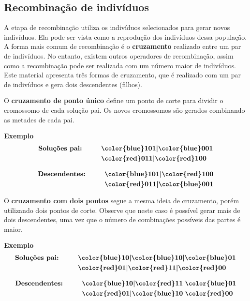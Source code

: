 \subsection{Recombinação de indivíduos}

A etapa de recombinação utiliza os indivíduos selecionados para gerar novos indivíduos. Ela pode ser vista como a reprodução dos indivíduos dessa população. A forma mais comum de recombinação é o \textbf{cruzamento} realizado entre um par de indivíduos. No entanto, existem outros operadores de recombinação, assim como a recombinação pode ser realizada com um número maior de indivíduos. Este material apresenta três formas de cruzamento, que é realizado com um par de indivíduos e gera dois descendentes (filhos).

O \textbf{cruzamento de ponto único} define um ponto de corte para dividir o cromossomo de cada solução pai. Os novos cromossomos são gerados combinando as metades de cada pai.

\insertspace
\textbf{Exemplo}
\begin{align*}
	\textbf{Soluções pai:}	& \hspace{1cm} \textbf{{\color{blue}101}|{\color{blue}001}} \\
							& \hspace{1cm} \textbf{{\color{red}011}|{\color{red}100}}
\end{align*}
\begin{center}
	\makebox[7cm]{\hrulefill}
\end{center}
\begin{align*}
	\textbf{Descendentes:}	& \hspace{1cm} \textbf{{\color{blue}101}|{\color{red}100}} \\
							& \hspace{1cm} \textbf{{\color{red}011}|{\color{blue}001}}
\end{align*}

O \textbf{cruzamento com dois pontos} segue a mesma ideia de cruzamento, porém utilizando dois pontos de corte. Observe que neste caso é possível gerar mais de dois descendentes, uma vez que o número de combinações possíveis das partes é maior.

\insertspace
\textbf{Exemplo}
\begin{align*}
	\textbf{Soluções pai:}	& \hspace{1cm} \textbf{{\color{blue}10}|{\color{blue}10}|{\color{blue}01}} \\
							& \hspace{1cm} \textbf{{\color{red}01}|{\color{red}11}|{\color{red}00}}
\end{align*}
\begin{center}
	\makebox[7cm]{\hrulefill}
\end{center}
\begin{align*}
	\textbf{Descendentes:}	& \hspace{1cm} \textbf{{\color{blue}10}|{\color{red}11}|{\color{blue}01}} \\
							& \hspace{1cm} \textbf{{\color{red}01}|{\color{blue}10}|{\color{red}00}}
\end{align*}

